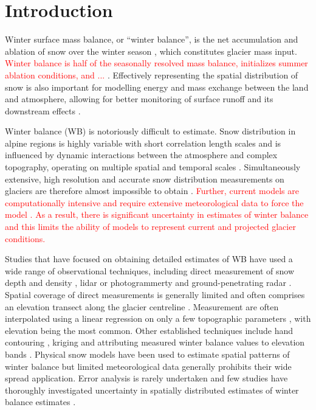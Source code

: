 \documentclass[review,oneside, letterpaper]{igs}
\begin{document}
\section{Introduction}

Winter surface mass balance, or ``winter balance'', is the net accumulation and ablation of snow over the winter season \citep{Cogley2011}, which constitutes glacier mass input. \textcolor{red}{Winter balance is half of the seasonally resolved mass balance, initializes summer ablation conditions, and ...} \citep[e.g.][]{Hock2005,Reveillet2016}. Effectively representing the spatial distribution of snow is also important for modelling energy and mass exchange between the land and atmosphere, allowing for better monitoring of surface runoff and its downstream effects \citep[e.g.][]{Clark2011}.

Winter balance (WB) is notoriously difficult to estimate. Snow distribution in alpine regions is highly variable with short correlation length scales \citep[e.g.][]{Anderton2004, Egli2011, Grunewald2010, Helbig2017, Lopez2011, Lopez2013, Machguth2006, Marshall2006} and is influenced by dynamic interactions between the atmosphere and complex topography, operating on multiple spatial and temporal scales \citep[e.g.][]{Barry1992, Liston2006, Clark2011}. Simultaneously extensive, high resolution and accurate snow distribution measurements on glaciers are therefore almost impossible to obtain \citep[e.g.][]{Cogley2011, McGrath2015}. \textcolor{red}{Further, current models are computationally intensive and require extensive meteorological data to force the model \citep{Dadic2010}. As a result, there is significant uncertainty in estimates of winter balance and this limits the ability of models to represent current and projected glacier conditions.}

Studies that have focused on obtaining detailed estimates of WB have used a wide range of observational techniques, including direct measurement of snow depth and density \citep[e.g.][]{Cullen2017}, lidar or photogrammerty \citep[e.g.][]{Sold2013} and ground-penetrating radar \citep[e.g.][]{Machguth2006, Gusmeroli2014, McGrath2015}. Spatial coverage of direct measurements is generally limited and often comprises an elevation transect along the glacier centreline \citep[e.g.][]{Kaser2003}. Measurement are often interpolated using a linear regression on only a few topographic parameters \citep[e.g.][]{MacDougall2011}, with elevation being the most common. Other established techniques include hand contouring \citep[e.g.][]{Tangborn1975}, kriging \citep[e.g.][]{Hock1999} and attributing measured winter balance values to elevation bands \citep[e.g.][]{Thibert2008}. Physical snow models have been used to estimate spatial patterns of winter balance \citep[e.g.][]{Mott2008, Schuler2008, Dadic2010} but limited meteorological data generally prohibits their wide spread application. Error analysis is rarely undertaken and few studies have thoroughly investigated uncertainty in spatially distributed estimates of winter balance estimates \citep[c.f.][]{Schuler2008}. 
\end{document}

